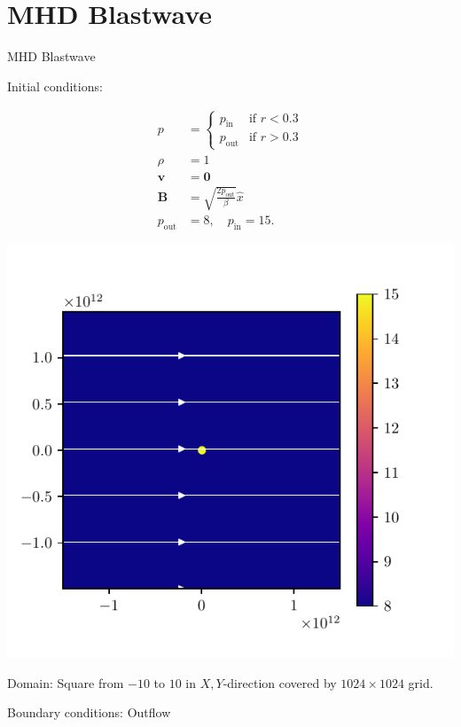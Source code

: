 \documentclass{beamer}
\begin{document}
\section{MHD Blastwave}
\begin{frame}{MHD Blastwave}

Initial conditions:\\
\begin{minipage}{.49\linewidth}
	\begin{align*}
	p &= \begin{cases}
		p_\text{in} & \text{if } r < 0.3\\
		p_\text{out} & \text{if } r > 0.3
	\end{cases} \\
	\rho &= 1 \\
	\mathbf v &=  \mathbf 0 \\
	\mathbf B &= \sqrt{\frac{2 p_\text{out} }{\beta}} \hat{x}\\
	p_\text{out}  &= 8, \quad p_\text{in}  = 15
.\end{align*}
\end{minipage}
\begin{minipage}{.49\linewidth}
	\includegraphics[width=\textwidth]{figures/initial_MHD.pdf}	
\end{minipage}
Domain: Square from $-10$ to $10$ in $ X, Y$-direction covered by $1024\times 1024$ grid.

Boundary conditions: Outflow
\end{frame}
\end{document}
